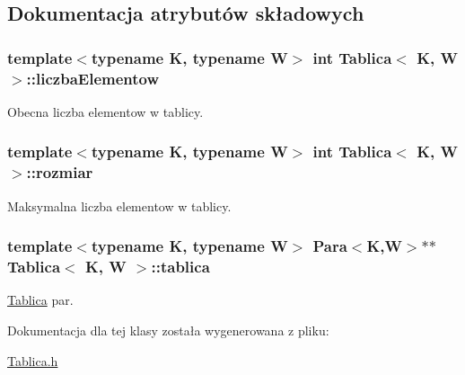 \subsection{\-Dokumentacja atrybutów składowych}
\hypertarget{class_tablica_a603b571fcc0d29b757bfd5fe27d0fadc}{
\subsubsection[{liczba\-Elementow}]{\setlength{\rightskip}{0pt plus 5cm}template$<$typename \-K, typename \-W$>$ int {\bf \-Tablica}$<$ \-K, \-W $>$\-::{\bf liczba\-Elementow}}}\label{class_tablica_a603b571fcc0d29b757bfd5fe27d0fadc}


\-Obecna liczba elementow w tablicy. 

\hypertarget{class_tablica_a40b3c86ceb2ec860b9d19ce0e866b406}{
\subsubsection[{rozmiar}]{\setlength{\rightskip}{0pt plus 5cm}template$<$typename \-K, typename \-W$>$ int {\bf \-Tablica}$<$ \-K, \-W $>$\-::{\bf rozmiar}}}\label{class_tablica_a40b3c86ceb2ec860b9d19ce0e866b406}


\-Maksymalna liczba elementow w tablicy. 

\hypertarget{class_tablica_a0d6b03ac0a2b996d4096038ef9315e9a}{
\subsubsection[{tablica}]{\setlength{\rightskip}{0pt plus 5cm}template$<$typename \-K, typename \-W$>$ {\bf \-Para}$<$\-K,\-W$>$$\ast$$\ast$ {\bf \-Tablica}$<$ \-K, \-W $>$\-::{\bf tablica}}}\label{class_tablica_a0d6b03ac0a2b996d4096038ef9315e9a}


\hyperlink{class_tablica}{\-Tablica} par. 



\-Dokumentacja dla tej klasy została wygenerowana z pliku\-:\begin{DoxyCompactItemize}
\item 
\hyperlink{_tablica_8h}{\-Tablica.\-h}\end{DoxyCompactItemize}
